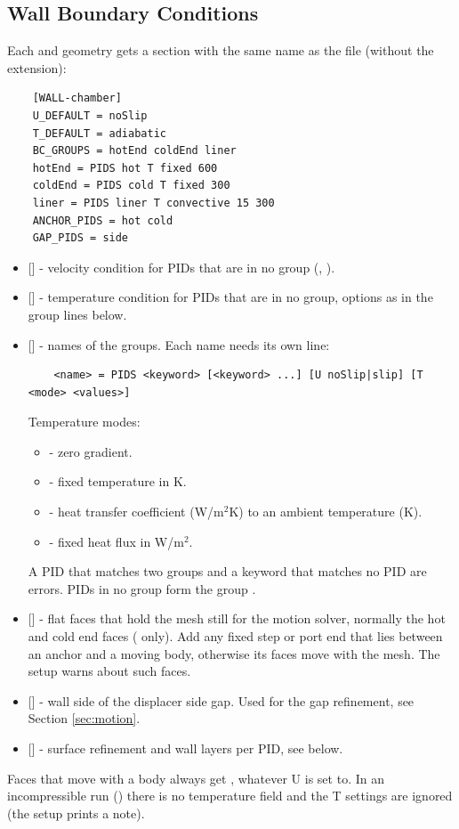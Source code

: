 \subsection{Wall Boundary Conditions}
Each  and  geometry gets a section with the same name as the file (without the extension):
\begin{lstlisting}
    [WALL-chamber]
    U_DEFAULT = noSlip
    T_DEFAULT = adiabatic
    BC_GROUPS = hotEnd coldEnd liner
    hotEnd = PIDS hot T fixed 600
    coldEnd = PIDS cold T fixed 300
    liner = PIDS liner T convective 15 300
    ANCHOR_PIDS = hot cold
    GAP_PIDS = side
\end{lstlisting}
\begin{itemize}
    \item {} [] - velocity condition for PIDs that are in no group (, ).
    \item {} [] - temperature condition for PIDs that are in no group, options as in the group lines below.
    \item {} [] - names of the groups. Each name needs its own line:
    \begin{lstlisting}
    <name> = PIDS <keyword> [<keyword> ...] [U noSlip|slip] [T <mode> <values>]
    \end{lstlisting}
    Temperature modes:
    \begin{itemize}
        \item {} - zero gradient.
        \item {} - fixed temperature in K.
        \item {} - heat transfer coefficient (W/m$^2$K) to an ambient temperature (K).
        \item {} - fixed heat flux in W/m$^2$.
    \end{itemize}
    A PID that matches two groups and a keyword that matches no PID are errors. PIDs in no group form the group .
    \item {} [] - flat faces that hold the mesh still for the motion solver, normally the hot and cold end faces ( only). Add any fixed step or port end that lies between an anchor and a moving body, otherwise its faces move with the mesh. The setup warns about such faces.
    \item {} [] - wall side of the displacer side gap. Used for the gap refinement, see Section \ref{sec:motion}.
    \item {} [] - surface refinement and wall layers per PID, see below.
\end{itemize}
Faces that move with a body always get , whatever U is set to. In an incompressible run () there is no temperature field and the T settings are ignored (the setup prints a note).


